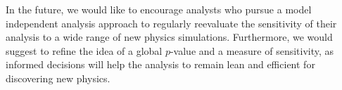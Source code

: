 In the future, we would like to encourage analysts who pursue a model independent analysis approach to regularly reevaluate the sensitivity of their analysis to a wide range of new physics simulations. Furthermore, we would suggest to refine the idea of a global $p$-value and a measure of sensitivity, as informed decisions will help the analysis to remain lean and efficient for discovering new physics.

